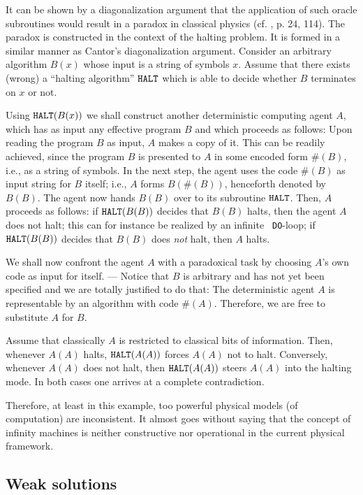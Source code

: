 It can be shown by a
diagonalization argument that the
application of
such oracle subroutines
would result in a paradox in classical physics
(cf. \cite{svozil-93}, p. 24, 114).
The paradox is constructed in the context of the halting problem.
It is formed in a similar manner as Cantor's diagonalization
argument.
Consider an arbitrary algorithm $B(x)$ whose input is a string of
symbols
$x$.
 Assume that there exists (wrong) a ``halting algorithm'' ${\tt HALT}$
 which  is
 able to decide whether $B$ terminates on $x$ or not.

 Using  ${\tt HALT}(B(x))$ we shall construct another
 deterministic computing agent
$A$, which
 has as input any effective program $B$ and which proceeds as follows:
 Upon reading the program $B$ as input, $A$ makes a copy of it.
 This  can be readily achieved, since
 the program $B$ is presented to $A$  in some
 encoded form $\# (B)$, i.e., as a string of symbols. In the next
 step, the agent uses the
 code $\# (B)$ as input string for $B$ itself; i.e., $A$  forms
 $B(\#(B))$, henceforth denoted by $B(B)$. The agent now hands
 $B(B)$ over to its
 subroutine ${\tt HALT}$.
 Then, $A$ proceeds as follows:
  if ${\tt HALT}(B(B))$ decides that $B(B)$
 halts, then the agent
 $A$ does not halt;
this can for instance be realized by an infinite {\tt
 DO}-loop;
  if ${\tt HALT}(B(B))$ decides that $B(B)$
 does {\em not} halt, then
 $A$ halts.

 We shall now confront the agent $A$ with a paradoxical task by
 choosing $A$'s own code as input for itself.
---
Notice that $B$ is arbitrary and has not yet been specified and we are
totally justified to do that:
The deterministic agent $A$ is representable by an algorithm with code
$\# (A)$. Therefore, we are free to substitute $A$ for $B$.

Assume that classically $A$ is restricted to classical bits of
information.
Then, whenever
 $A(A)$ halts,  ${\tt HALT}(A(A))$  forces
 $A(A)$ not to halt.
Conversely, whenever $A(A)$ does not halt, then ${\tt HALT}(A(A))$
 steers $A(A)$
 into the halting mode. In both cases one arrives at a
complete contradiction.

Therefore, at least in this example, too powerful physical models (of
computation) are inconsistent.
It almost goes without saying that the concept of infinity
machines is neither constructive nor operational in the current physical
framework.

\subsection{Weak solutions}

